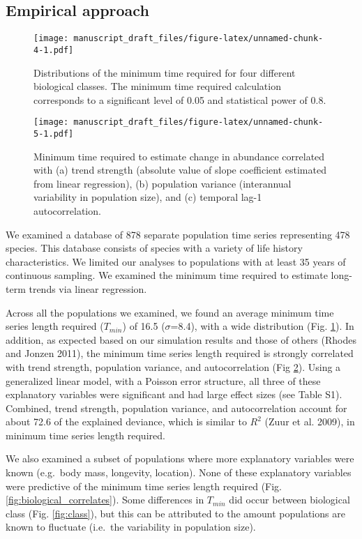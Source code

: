 \documentclass[12pt,]{article}
\begin{document}
\subsection{Empirical approach}\label{empirical-approach-1}

\begin{figure}[htbp]
\centering
\texttt{[image: manuscript\_draft\_files/figure-latex/unnamed-chunk-4-1.pdf]}
\caption{Distributions of the minimum time required for four different
biological classes. The minimum time required calculation corresponds to
a significant level of 0.05 and statistical power of
0.8.\label{fig:min_time_dist}}
\end{figure}

\begin{figure}[htbp]
\centering
\texttt{[image: manuscript\_draft\_files/figure-latex/unnamed-chunk-5-1.pdf]}
\caption{Minimum time required to estimate change in abundance
correlated with (a) trend strength (absolute value of slope coefficient
estimated from linear regression), (b) population variance (interannual
variability in population size), and (c) temporal lag-1
autocorrelation.\label{fig:correlates}}
\end{figure}

We examined a database of 878 separate population time series
representing 478 species. This database consists of species with a
variety of life history characteristics. We limited our analyses to
populations with at least 35 years of continuous sampling. We examined
the minimum time required to estimate long-term trends via linear
regression.

Across all the populations we examined, we found an average minimum time
series length required (\(T_{min}\)) of 16.5 (\(\sigma\)=8.4), with a
wide distribution (Fig. \ref{fig:min_time_dist}). In addition, as
expected based on our simulation results and those of others (Rhodes and
Jonzen 2011), the minimum time series length required is strongly
correlated with trend strength, population variance, and autocorrelation
(Fig \ref{fig:correlates}). Using a generalized linear model, with a
Poisson error structure, all three of these explanatory variables were
significant and had large effect sizes (see Table S1). Combined, trend
strength, population variance, and autocorrelation account for about
72.6 of the explained deviance, which is similar to \(R^2\) (Zuur et al.
2009), in minimum time series length required.

We also examined a subset of populations where more explanatory
variables were known (e.g.~body mass, longevity, location). None of
these explanatory variables were predictive of the minimum time series
length required (Fig. \ref{fig:biological_correlates}). Some differences
in \(T_{min}\) did occur between biological class (Fig.
\ref{fig:class}), but this can be attributed to the amount populations
are known to fluctuate (i.e.~the variability in population size).
\end{document}
